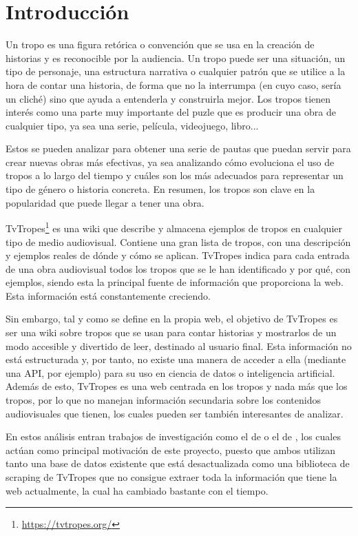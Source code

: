 \chapter{Introducción}

Un tropo es una figura retórica o convención que se usa en la creación de
historias y es reconocible por la audiencia. Un tropo puede ser una situación,
un tipo de personaje, una estructura narrativa o cualquier patrón que se utilice
a la hora de contar una historia, de forma que no la interrumpa (en cuyo caso,
sería un cliché) sino que ayuda a entenderla y construirla mejor. Los tropos
tienen interés como una parte muy importante del puzle que es producir una obra
de cualquier tipo, ya sea una serie, película, videojuego, libro... 

Estos se pueden analizar para obtener una serie de pautas que puedan servir para
crear nuevas obras más efectivas, ya sea analizando cómo evoluciona el uso de
tropos a lo largo del tiempo y cuáles son los más adecuados para representar un
tipo de género o historia concreta. En resumen, los tropos son clave en la
popularidad que puede llegar a tener una obra. 

TvTropes\footnote{\url{https://tvtropes.org/}} es una wiki que describe y
almacena ejemplos de tropos en cualquier tipo de medio audiovisual. Contiene una
gran lista de tropos, con una descripción y ejemplos reales de dónde y cómo se
aplican. TvTropes indica para cada entrada de una obra audiovisual todos los
tropos que se le han identificado y por qué, con ejemplos, siendo esta la
principal fuente de información que proporciona la web. Esta información está
constantemente creciendo.

Sin embargo, tal y como se define en la propia web, el objetivo de TvTropes es
ser una wiki sobre tropos que se usan para contar historias y mostrarlos de un
modo accesible y divertido de leer, destinado al usuario final. Esta información
no está estructurada y, por tanto, no existe una manera de acceder a ella
(mediante una API, por ejemplo) para su uso en ciencia de datos o inteligencia
artificial. Además de esto, TvTropes es una web centrada en los tropos y nada
más que los tropos, por lo que no manejan información secundaria sobre los
contenidos audiovisuales que tienen, los cuales pueden ser también interesantes
de analizar.

En estos análisis entran trabajos de investigación como el de
\cite{garcia2020tropes} o el de \cite{garcia2021simpsons}, los cuales actúan
como principal motivación de este proyecto, puesto que ambos utilizan tanto una
base de datos existente que está desactualizada como una biblioteca de scraping
de TvTropes que no consigue extraer toda la información que tiene la web
actualmente, la cual ha cambiado bastante con el tiempo.

